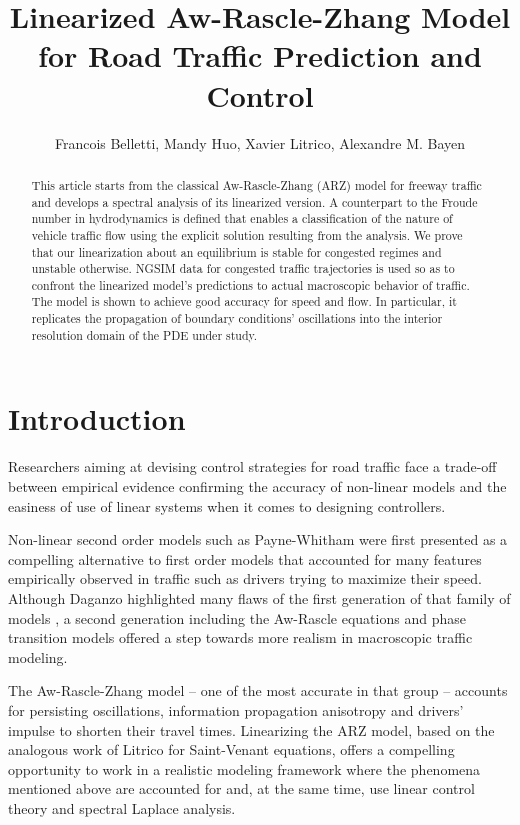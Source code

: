 \documentclass[a4paper, 10pt, conference]{ieeeconf}      %
\title{\LARGE \bf
Linearized Aw-Rascle-Zhang Model for Road Traffic Prediction and Control
}
\author{Francois Belletti, Mandy Huo, Xavier Litrico, Alexandre M. Bayen}
\begin{document}
\maketitle
\thispagestyle{empty}
\pagestyle{empty}

\begin{abstract}
This article starts from the classical Aw-Rascle-Zhang (ARZ) model for freeway traffic and develops a spectral analysis of its linearized version. A counterpart to the Froude number in hydrodynamics is defined that enables a classification of the nature of vehicle traffic flow using the explicit solution resulting from the analysis. We prove that our linearization about an equilibrium is stable for congested regimes and unstable otherwise. NGSIM data for congested traffic trajectories is used so as to confront the linearized model's predictions to actual macroscopic behavior of traffic. The model is shown to achieve good accuracy for speed and flow. In particular, it replicates the propagation of boundary conditions' oscillations into the interior resolution domain of the PDE under study.
\end{abstract}


\section{Introduction}

Researchers aiming at devising control strategies for road traffic face a trade-off between empirical evidence confirming the accuracy of non-linear models \cite{zielke2008empirical, Jamitons2008} and the easiness of use of linear systems when it comes to designing controllers.

Non-linear second order models such as Payne-Whitham \cite{payne1971models, whitham1974linear} were first presented as a compelling alternative to first order models \cite{LW, Richards} that accounted for many features empirically observed in traffic such as drivers trying to maximize their speed. Although Daganzo highlighted many flaws of the first generation of that family of models \cite{Dag_requiem}, a second generation including the Aw-Rascle equations \cite{AR} and phase transition models\cite{colombo2003hyperbolic} offered a step towards more realism in macroscopic traffic modeling.

The Aw-Rascle-Zhang model -- one of the most accurate in that group -- accounts for persisting oscillations, information propagation anisotropy and drivers' impulse to shorten their travel times. Linearizing the ARZ model, based on the analogous work of Litrico \cite{litrico2009modeling} for Saint-Venant equations, offers a compelling opportunity to work in a realistic modeling framework where the phenomena mentioned above are accounted for and, at the same time, use linear control theory and spectral Laplace analysis.
\end{document}
